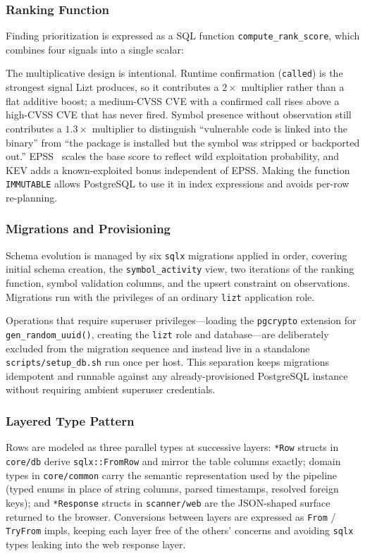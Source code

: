 \documentclass[conference]{IEEEtran}
\begin{document}
\subsubsection{Ranking Function}

Finding prioritization is expressed as a SQL function \texttt{compute\_rank\_score}, which combines four signals into a single scalar:

The multiplicative design is intentional.
Runtime confirmation (\texttt{called}) is the strongest signal Lizt produces, so it contributes a $2\times$ multiplier rather than a flat additive boost; a medium-CVSS CVE with a confirmed call rises above a high-CVSS CVE that has never fired.
Symbol presence without observation still contributes a $1.3\times$ multiplier to distinguish ``vulnerable code is linked into the binary'' from ``the package is installed but the symbol was stripped or backported out.''
EPSS~\cite{epss} scales the base score to reflect wild exploitation probability, and KEV adds a known-exploited bonus independent of EPSS.
Making the function \texttt{IMMUTABLE} allows PostgreSQL to use it in index expressions and avoids per-row re-planning.

\subsubsection{Migrations and Provisioning}

Schema evolution is managed by six \texttt{sqlx} migrations applied in order, covering initial schema creation, the \texttt{symbol\_activity} view, two iterations of the ranking function, symbol validation columns, and the upsert constraint on observations.
Migrations run with the privileges of an ordinary \texttt{lizt} application role.

Operations that require superuser privileges---loading the \texttt{pgcrypto} extension for \texttt{gen\_random\_uuid()}, creating the \texttt{lizt} role and database---are deliberately excluded from the migration sequence and instead live in a standalone \texttt{scripts/setup\_db.sh} run once per host.
This separation keeps migrations idempotent and runnable against any already-provisioned PostgreSQL instance without requiring ambient superuser credentials.

\subsubsection{Layered Type Pattern}

Rows are modeled as three parallel types at successive layers: \texttt{*Row} structs in \texttt{core/db} derive \texttt{sqlx::FromRow} and mirror the table columns exactly; domain types in \texttt{core/common} carry the semantic representation used by the pipeline (typed enums in place of string columns, parsed timestamps, resolved foreign keys); and \texttt{*Response} structs in \texttt{scanner/web} are the JSON-shaped surface returned to the browser.
Conversions between layers are expressed as \texttt{From} / \texttt{TryFrom} impls, keeping each layer free of the others' concerns and avoiding \texttt{sqlx} types leaking into the web response layer.
\end{document}

